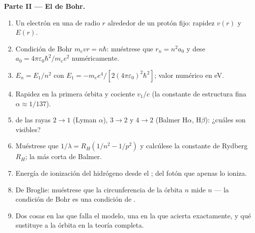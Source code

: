 \begin{problem}
\medskip
\noindent\textbf{Parte II --- El  de Bohr.}
\begin{enumerate}[resume]
  \item Un electrón en una  de radio $r$ alrededor de un
        protón fijo: rapidez $v(r)$ y  $E(r)$.
  \item Condición de Bohr $m_evr = n\hbar$: muéstrese que $r_n = n^2a_0$ y
        dese $a_0 = 4\pi\varepsilon_0\hbar^2/m_ee^2$ numéricamente.
  \item $E_n = E_1/n^2$ con $E_1 = -m_ee^4/[2(4\pi\varepsilon_0)^2\hbar^2]$;
        valor numérico en eV.
  \item Rapidez en la primera órbita y cociente $v_1/c$ (la constante de
        estructura fina $\alpha \approx 1/137$).
  \item {} de las rayas $2 \to 1$ (Lyman $\alpha$), $3 \to 2$ y
        $4 \to 2$ (Balmer H$\alpha$, H$\beta$): ¿cuáles son visibles?
  \item Muéstrese que $1/\lambda = R_H(1/n^2 - 1/p^2)$ y calcúlese la
        constante de Rydberg $R_H$; la  más corta de Balmer.
  \item Energía de ionización del hidrógeno desde el ;
         del fotón que apenas lo ioniza.
  \item De Broglie: muéstrese que la circunferencia de la órbita $n$ mide
        $n$  --- la condición de Bohr es una condición de
        .
  \item Dos cosas en las que falla el modelo, una en la que acierta
        exactamente, y qué sustituye a la órbita en la teoría completa.
\end{enumerate}


\end{problem}
